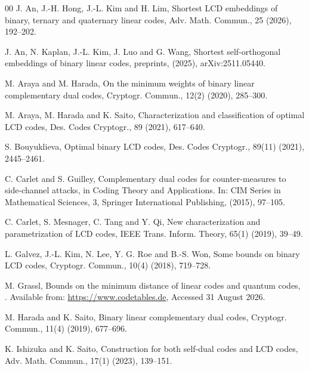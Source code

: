 \documentclass{article}
\theoremstyle{definition}
\theoremstyle{remark}
\begin{document}
\begin{thebibliography}{00}
\newblock J. An, J.-H. Hong, J.-L. Kim and H. Lim,
\newblock Shortest LCD embeddings of binary, ternary and quaternary linear codes,
\newblock Adv. Math. Commun., 25 (2026), 192--202.

\newblock J. An, N. Kaplan, J.-L. Kim, J. Luo and G. Wang,
\newblock Shortest self-orthogonal embeddings of binary linear codes,
\newblock preprints, (2025), arXiv:2511.05440.

\newblock M. Araya and M. Harada,
\newblock On the minimum weights of binary linear complementary dual codes,
\newblock Cryptogr. Commun., 12(2) (2020), 285--300.

\newblock M. Araya, M. Harada and K. Saito,
\newblock Characterization and classification of optimal LCD codes,
\newblock Des. Codes Cryptogr., 89 (2021), 617--640.

\newblock S. Bouyuklieva,
\newblock Optimal binary LCD codes,
\newblock Des. Codes Cryptogr., 89(11) (2021), 2445--2461.

\newblock C. Carlet and S. Guilley,
\newblock Complementary dual codes for counter-measures to side-channel attacks,
\newblock in Coding Theory and Applications. In: CIM Series in Mathematical Sciences, 3, Springer International Publishing, (2015), 97--105.

\newblock C. Carlet, S. Mesnager, C. Tang and Y. Qi,
\newblock New characterization and parametrization of LCD codes,
\newblock IEEE Trans. Inform. Theory, 65(1) (2019), 39--49.

\newblock L. Galvez, J.-L. Kim, N. Lee, Y. G. Roe and B.-S. Won,
\newblock Some bounds on binary LCD codes,
\newblock Cryptogr. Commun., 10(4) (2018), 719--728.

\newblock M. Grassl,
\newblock Bounds on the minimum distance of linear codes and quantum codes,
. Available from: \url{https://www.codetables.de}, Accessed 31 August 2026.

\newblock M. Harada and K. Saito,
\newblock Binary linear complementary dual codes,
\newblock Cryptogr. Commun., 11(4) (2019), 677--696.

\newblock K. Ishizuka and K. Saito,
\newblock Construction for both self-dual codes and LCD codes,
\newblock Adv. Math. Commun., 17(1) (2023), 139--151.


\end{thebibliography}
\end{document}
